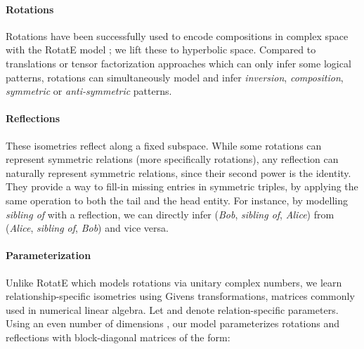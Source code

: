 \documentclass[11pt,a4paper]{article}
\begin{document}
\paragraph{Rotations} Rotations have been successfully used to encode compositions in complex space with the RotatE model \cite{sun2019rotate}; we lift these to hyperbolic space. 
Compared to translations or tensor factorization approaches which can only infer some logical patterns, rotations can simultaneously model and infer \textit{inversion}, \textit{composition}, \textit{symmetric} or \textit{anti-symmetric} patterns.

\paragraph{Reflections} 
These isometries reflect along a fixed subspace.
While some rotations can represent symmetric relations (more specifically rotations), any reflection can naturally represent
symmetric relations, since their second power is the
identity. 
They provide a way to fill-in missing entries in symmetric triples, by applying the same operation to both the tail and the head entity.
For instance, by modelling \textit{sibling of} with a reflection, we can directly infer (\textit{Bob}, \textit{sibling of}, \textit{Alice}) from (\textit{Alice}, \textit{sibling of}, \textit{Bob}) and vice versa.

\paragraph{Parameterization} Unlike RotatE which models rotations via unitary complex numbers, we learn relationship-specific isometries using Givens transformations,  matrices commonly used in numerical linear algebra. 
Let  and  denote relation-specific parameters. 
Using an even number of dimensions , our model parameterizes rotations and reflections with block-diagonal matrices of the form:
\end{document}
